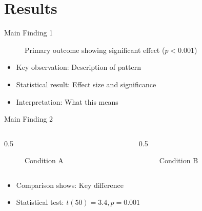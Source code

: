 \documentclass[aspectratio=169,11pt]{beamer}
\begin{document}

\section{Results}

\begin{frame}{Main Finding 1}
  \begin{figure}
    \centering
    \caption{Primary outcome showing significant effect ($p < 0.001$)}
  \end{figure}
  
  \vspace{0.3cm}
  
  \begin{itemize}
    \item<2-> Key observation: Description of pattern
    \item<3-> Statistical result: Effect size and significance
    \item<4-> Interpretation: What this means
  \end{itemize}
\end{frame}

\begin{frame}{Main Finding 2}
  \begin{columns}[c]
    
    \begin{column}{0.5\textwidth}
      \begin{figure}
        \centering
        \framebox[0.9\textwidth][c]{[Result 2A]}
        \caption{Condition A}
      \end{figure}
    \end{column}
    
    \begin{column}{0.5\textwidth}
      \begin{figure}
        \centering
        \framebox[0.9\textwidth][c]{[Result 2B]}
        \caption{Condition B}
      \end{figure}
    \end{column}
    
  \end{columns}
  
  \vspace{0.5cm}
  
  \begin{itemize}
    \item Comparison shows: Key difference
    \item Statistical test: $t(50) = 3.4, p = 0.001$
  \end{itemize}
\end{frame}
\end{document}
